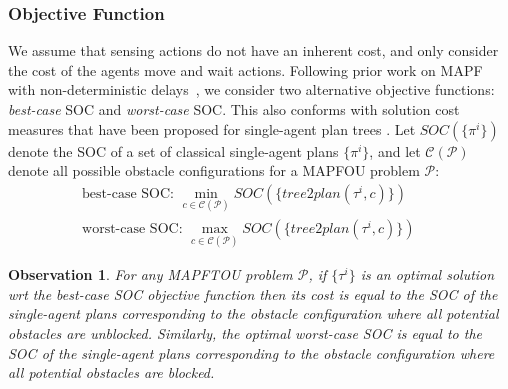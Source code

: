 \documentclass[letterpaper]{article} %
\newcommand{\blocked}{\textit{blocked}}
\newcommand{\unblocked}{\textit{unblocked}}
\newcommand{\toplan}{\textit{tree2plan}}
\newtheorem{observation}{Observation}
\begin{document}
\subsubsection*{Objective Function}
We assume that sensing actions do not have an inherent cost, and only consider the cost of the agents move and wait actions.
Following prior work on MAPF with non-deterministic delays~\cite{shahar2021safe}, we consider two alternative objective functions: \emph{best-case} SOC and \emph{worst-case} SOC.
This also conforms with solution cost measures that have been proposed for single-agent plan trees \cite{shmaryahu2019comparative}.
Let $SOC(\{\pi^i\})$ denote the SOC of a set of classical single-agent plans $\{\pi^i\}$, and let $\mathcal{C}(\mathcal{P})$ denote all possible obstacle configurations for a MAPFOU problem $\mathcal{P}$:
\begin{eqnarray}
 \mbox{best-case SOC: } \min_{c\in\mathcal{C}(\mathcal{P})} SOC(\{\toplan(\tau^i,c)\}) &&\\
 \mbox{worst-case SOC: } \max_{c\in\mathcal{C}(\mathcal{P})} SOC(\{\toplan(\tau^i,c)\})&&
\end{eqnarray}
\begin{observation}
For any MAPFTOU problem $\mathcal{P}$, if $\{\tau^i\}$ is an optimal solution wrt
the best-case SOC objective function then its cost is equal to the SOC of the single-agent plans corresponding to the obstacle configuration where all potential obstacles are \unblocked.
Similarly, the optimal worst-case SOC is equal to the SOC of the single-agent plans corresponding to the obstacle configuration where all potential obstacles are \blocked.
\label{obs:best-and-worst}
\end{observation}
\end{document}
